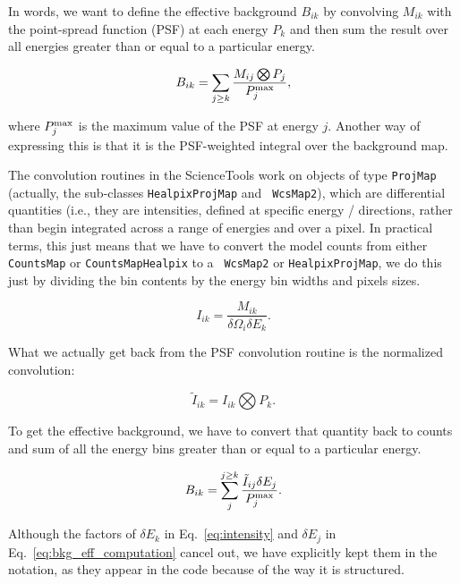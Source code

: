 \documentclass[preprint]{aastex}
\begin{document}
In words, we want to define the effective background $B_{ik}$ by
convolving $M_{ik}$ with the point-spread function (PSF) at each
energy $P_k$ and then sum the result over all energies greater than or
equal to a particular energy.

\begin{equation}\label{eq:bkg_eff_defintion}
B_{ik} = \sum_{j \ge k} \frac{M_{ij} \bigotimes P_{j}}{P_{j}^{\rm max}}, 
\end{equation}

\noindent where $P_{j}^{\rm max}$ is the maximum value of the PSF at energy $j$.
Another way of expressing this is that it is the PSF-weighted integral over
the background map.  

The convolution routines in the ScienceTools work on objects of type
{\tt ProjMap} (actually, the sub-classes {\tt HealpixProjMap} and {\tt
  WcsMap2}), which are differential quantities (i.e., they are
intensities, defined at specific energy / directions, rather than
begin integrated across a range of energies and over a pixel.  In
practical terms, this just means that we have to convert the model
counts from either {\tt CountsMap} or {\tt CountsMapHealpix} to a {\tt
  WcsMap2} or {\tt HealpixProjMap}, we do this just by dividing the
bin contents by the energy bin widths and pixels sizes.

\begin{equation}\label{eq:intensity}
I_{ik} = \frac{M_{ik}}{\delta \Omega_i \delta E_k}.
\end{equation}

\noindent What we actually get back from the PSF convolution routine
is the normalized convolution:

\begin{equation}\label{eq:convolved_intensity}
\tilde{I}_{ik} = I_{ik} \bigotimes P_{k}.
\end{equation}

To get the effective background, we have to convert that quantity back
to counts and sum of all the energy bins greater than or equal to a
particular energy.

\begin{equation}\label{eq:bkg_eff_computation}
B_{ik} = \sum_{j}^{j \ge k} \frac{\tilde{I}_{ij} \delta E_j}{P_{j}^{\rm max}}.
\end{equation}

\noindent Although the factors of $\delta E_k$ in Eq.~\ref{eq:intensity}
and $\delta E_j$ in Eq.~\ref{eq:bkg_eff_computation} cancel out, we have 
explicitly kept them in the notation, as they appear in the code because
of the way it is structured.
\end{document}
